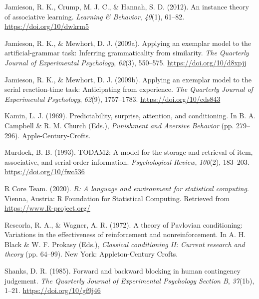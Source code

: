 \documentclass[
  english,
  man,floatsintext]{apa6}
\begin{document}
\leavevmode\hypertarget{ref-jamiesonInstanceTheoryAssociative2012}{}%
Jamieson, R. K., Crump, M. J. C., \& Hannah, S. D. (2012). An instance theory of associative learning. \emph{Learning \& Behavior}, \emph{40}(1), 61--82. \url{https://doi.org/10/dwkrm5}

\leavevmode\hypertarget{ref-jamiesonApplyingExemplarModel2009}{}%
Jamieson, R. K., \& Mewhort, D. J. (2009a). Applying an exemplar model to the artificial-grammar task: Inferring grammaticality from similarity. \emph{The Quarterly Journal of Experimental Psychology}, \emph{62}(3), 550--575. \url{https://doi.org/10/d8xpjj}

\leavevmode\hypertarget{ref-jamiesonApplyingExemplarModel2009a}{}%
Jamieson, R. K., \& Mewhort, D. J. (2009b). Applying an exemplar model to the serial reaction-time task: Anticipating from experience. \emph{The Quarterly Journal of Experimental Psychology}, \emph{62}(9), 1757--1783. \url{https://doi.org/10/cds843}

\leavevmode\hypertarget{ref-kaminPredictabilitySurpriseAttention1969}{}%
Kamin, L. J. (1969). Predictability, surprise, attention, and conditioning. In B. A. Campbell \& R. M. Church (Eds.), \emph{Punishment and Aversive Behavior} (pp. 279--296). Apple-Century-Crofts.

\leavevmode\hypertarget{ref-murdockTODAM2ModelStorage1993}{}%
Murdock, B. B. (1993). TODAM2: A model for the storage and retrieval of item, associative, and serial-order information. \emph{Psychological Review}, \emph{100}(2), 183--203. \url{https://doi.org/10/fwc536}

\leavevmode\hypertarget{ref-R-base}{}%
R Core Team. (2020). \emph{R: A language and environment for statistical computing}. Vienna, Austria: R Foundation for Statistical Computing. Retrieved from \url{https://www.R-project.org/}

\leavevmode\hypertarget{ref-rescorlaTheoryPavlovianConditioning1972}{}%
Rescorla, R. A., \& Wagner, A. R. (1972). A theory of Pavlovian conditioning: Variations in the effectiveness of reinforcement and nonreinforcement. In A. H. Black \& W. F. Prokasy (Eds.), \emph{Classical conditioning II: Current research and theory} (pp. 64--99). New York: Appleton-Century Crofts.

\leavevmode\hypertarget{ref-shanksForwardBackwardBlocking1985}{}%
Shanks, D. R. (1985). Forward and backward blocking in human contingency judgement. \emph{The Quarterly Journal of Experimental Psychology Section B}, \emph{37}(1b), 1--21. \url{https://doi.org/10/gf9j46}
\end{document}
